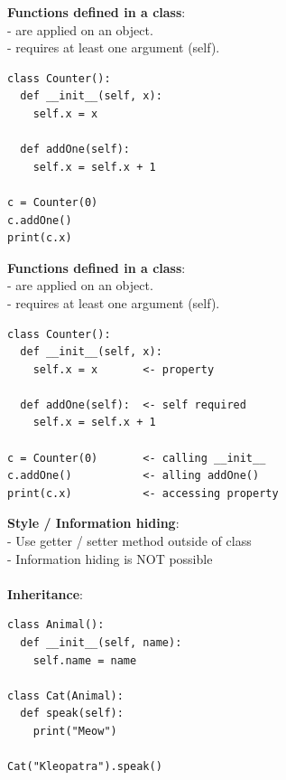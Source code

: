 \documentclass{beamer}
\begin{document}
\begin{frame}[fragile]
\textbf{Functions defined in a class}:\\
- are applied on an object.\\
- requires at least one argument (self).

\begin{example}
 \begin{verbatim}
class Counter():
  def __init__(self, x):
    self.x = x

  def addOne(self):
    self.x = self.x + 1
    
c = Counter(0)
c.addOne()
print(c.x)
\end{verbatim}	
\end{example}
\end{frame}


\begin{frame}[fragile]
	\textbf{Functions defined in a class}:\\
	- are applied on an object.\\
	- requires at least one argument (self).
	
	\begin{example}
		\begin{verbatim}
class Counter():
  def __init__(self, x):
    self.x = x       <- property
	
  def addOne(self):  <- self required
	self.x = self.x + 1
		
c = Counter(0)       <- calling __init__
c.addOne()           <- alling addOne()
print(c.x)           <- accessing property
		\end{verbatim}	
	\end{example}
\end{frame}


\begin{frame}[fragile]
	\textbf{Style / Information hiding}:\\
	- Use getter / setter method outside of class\\
	- Information hiding is NOT possible\\\\
	\textbf{Inheritance}:
	\begin{example}
		\begin{verbatim}
class Animal():
  def __init__(self, name):
    self.name = name
    
class Cat(Animal):
  def speak(self):
	print("Meow")

Cat("Kleopatra").speak()
		\end{verbatim}
	\end{example}
\end{frame}
\end{document}
